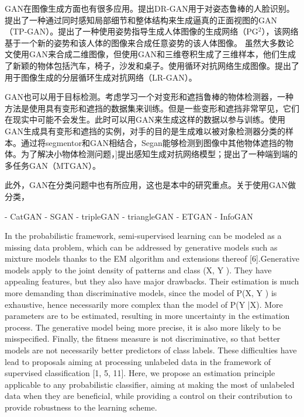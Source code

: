 GAN在图像生成方面也有很多应用。\citet{tran2017disentangled}提出DR-GAN用于对姿态鲁棒的人脸识别。\citet{huang2017beyond}提出了一种通过同时感知局部细节和整体结构来生成逼真的正面视图的GAN（TP-GAN）。\citet{ma2017pose}提出了一种使用姿势指导生成人体图像的生成网络（PG$^2$），该网络基于一个新的姿势和该人体的图像来合成任意姿势的该人体图像。
虽然大多数论文使用GAN来合成二维图像\cite{bao2017cvae,dong2017semantic}，但\citet{wu2016learning}使用GAN和三维卷积生成了三维样本，他们生成了新颖的物体包括汽车，椅子，沙发和桌子。\citet{im2016generating}使用循环对抗网络生成图像。\citet{yang2017lr}提出了用于图像生成的分层循环生成对抗网络（LR-GAN）。

GAN也可以用于目标检测。考虑学习一个对变形和遮挡鲁棒的物体检测器，一种方法是使用具有变形和遮挡的数据集来训练。但是一些变形和遮挡非常罕见，它们在现实中可能不会发生。此时可以用GAN来生成这样的数据以参与训练。\citet{wang2017fast}使用GAN生成具有变形和遮挡的实例，对手的目的是生成难以被对象检测器分类的样本。通过将segmentor和GAN相结合，Segan\cite{ehsani2018segan}能够检测到图像中其他物体遮挡的物体。为了解决小物体检测问题，\citet{li2017perceptual}]提出感知生成对抗网络模型；\citet{bai2018sod}提出了一种端到端的多任务GAN（MTGAN）。

此外，GAN在分类问题中也有所应用，这也是本中的研究重点。关于使用GAN做分类，

- CatGAN
- SGAN 
- tripleGAN
- triangleGAN
- ETGAN
- InfoGAN

In the probabilistic framework, semi-supervised learning can be modeled as a missing data problem, which can be addressed by generative models such as mixture models thanks to the EM algorithm and extensions thereof [6].Generative models apply to the joint density of patterns and class (X, Y ). They have appealing features, but they also have major drawbacks. Their estimation is much more demanding than discriminative models, since the model of P(X, Y ) is exhaustive, hence necessarily more complex than the model of P(Y |X). More parameters are to be estimated, resulting in more uncertainty in the estimation process. The generative model being more precise, it is also more likely to be misspecified. Finally, the fitness measure is not discriminative, so that better models are not necessarily better predictors of class labels. These difficulties have lead to proposals aiming at processing unlabeled data in the framework of supervised classification [1, 5, 11].  Here, we propose an estimation principle applicable to any probabilistic classifier, aiming at making the most of unlabeled data when they are beneficial, while providing a control on their contribution to provide robustness to the learning scheme.

